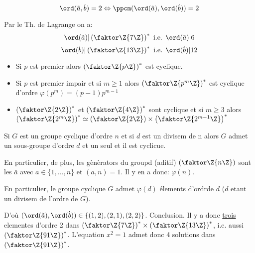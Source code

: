 $$\ord(\tilde a, \dot b)=2\Leftrightarrow \ppcm(\ord(\tilde a),\ord(\dot b))=2$$

Par le Th. de Lagrange on a:
$$ \ord(\tilde a)|\left(\faktor\Z{7\Z}\right)^\ast\mbox{ i.e. } \ord(\tilde a)|6$$
$$\ord(\dot b) | \left(\faktor\Z{13\Z}\right)^\ast \mbox{ i.e. } \ord(\dot b) | 12$$

\begin{rappel}
	\begin{itemize}
		\item Si $p$ est premier alors $\left(\faktor\Z{p\Z}\right)^\ast$ est cyclique.
		\item Si $p$ est  premier impair et si $m\geq 1$ alors $\left(\faktor\Z{p^m\Z}\right)^\ast$ est cyclique d'ordre $\varphi (p^m)=(p-1)p^{m-1}$
		\item $\left(\faktor\Z{2\Z}\right)^\ast$ et $\left(\faktor\Z{4\Z}\right)^\ast$ sont cyclique et si $m\geq 3$ alors $\left(\faktor\Z{2^m\Z}\right)^\ast\simeq\left(\faktor\Z{2\Z}\right)\times \left(\faktor\Z{2^{m-1}\Z}\right)^\ast$
	\end{itemize}
	Si $G$ est un groupe cyclique d'ordre $n$ et si $d$ est un divisem de n alors $G$ admet un sous-groupe d'ordre $d$ et un seul et il est cyclicue.
	
	En particulier, de plus, les gènèrators du groupd (aditif) $\left(\faktor\Z{n\Z}\right)$ sont les $\bar a$ avec $a\in\{1,...,n\}$ et $(a,n)=1$. Il y en a donc: $\varphi (n)$.
	
	En particulier, le groupe cyclique $G$ admet $\varphi (d)$ élements d'ordrde $d$ ($d$ etant un divisem de l'ordre de $G$).
\end{rappel}

D'où $(\ord(\tilde a),\ord(\dot b))\in \{(1,2),(2,1),(2,2)\}$. Conclusion. Il y a donc \underline{trois} elementes d'ordre 2 dans $\left( \faktor\Z{7\Z} \right)^\ast \times \left( \faktor\Z{13\Z} \right)^\ast$, i.e. aussi $\left(\faktor\Z{91\Z}\right)^\ast$. L'equation $x^2=1$ admet donc 4 solutions dans $\left(\faktor\Z{91\Z}\right)^\ast$.

